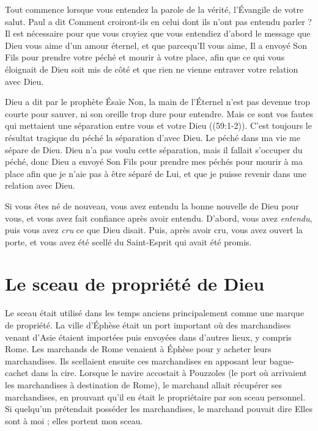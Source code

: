 Tout commence lorsque vous entendez \Og la parole de la vérité,
 l'Évangile de votre salut. \Fg{} Paul a dit\frcolon{}
 \Og Comment croiront-ils en celui dont ils n'ont pas entendu parler ? \Fg{}
 Il est nécessaire pour que vous croyiez que vous entendiez d'abord le message
 que Dieu vous aime d'un amour éternel, et que parcequ'Il vous aime,
 Il a envoyé Son Fils pour prendre votre péché et mourir à votre place,
 afin que ce qui vous éloignait de Dieu soit mis de côté et que rien
 ne vienne entraver votre relation avec Dieu.

Dieu a dit par le prophète Ésaïe\frcolon{}
 \Og Non, la main de l'Éternel n'est pas devenue trop courte pour sauver,
 ni son oreille trop dure pour entendre. Mais ce sont vos fautes qui mettaient
 une séparation entre vous et votre Dieu \Fg{} ((59:1-2)).
 C'est toujours le résultat tragique du péché\frcolon{} la séparation d'avec Dieu.
 Le péché dans ma vie me sépare de Dieu.
 Dieu n'a pas voulu cette séparation, mais il fallait s'occuper du péché,
 donc Dieu a envoyé Son Fils pour prendre mes péchés
 \ocadr pour mourir à ma place \ocadr afin que je n'aie pas
 à être séparé de Lui, et que je puisse revenir
 dans une relation avec Dieu.

Si vous êtes né de nouveau, vous avez entendu
 la bonne nouvelle de Dieu pour vous, et vous avez fait confiance
 après avoir entendu. D'abord, vous avez \emph{entendu},
 puis vous avez \emph{cru} ce que Dieu disait.
 Puis, après avoir cru, vous avez ouvert la porte,
 et vous avez été \Og scellé du Saint-Esprit qui avait été promis. \Fg{}


\section{Le sceau de propri\'et\'e de Dieu}

\begin{specialpar}{}
Le sceau était utilisé dans les temps anciens principalement
 comme une marque de propriété.
 La ville d'Éphèse était un port important où des marchandises
 venant d'Asie étaient importées puis envoyées dans d'autres lieux,
 y compris Rome.
 Les marchands de Rome venaient à Éphèse pour y acheter leurs marchandises.
 Ils scellaient ensuite ces marchandises en apposant leur bague-cachet
 dans la cire.
 Lorsque le navire accostait à Pouzzoles
 (le port où arrivaient les marchandises à destination de Rome),
 le marchand allait récupérer ses marchandises,
 en prouvant qu'il en était le propriétaire par son sceau personnel.
 Si quelqu'un prétendait posséder les marchandises,
 le marchand pouvait dire\frcolon{}
 \Og Elles sont à moi ; elles portent mon sceau. \Fg{}
\end{specialpar}

